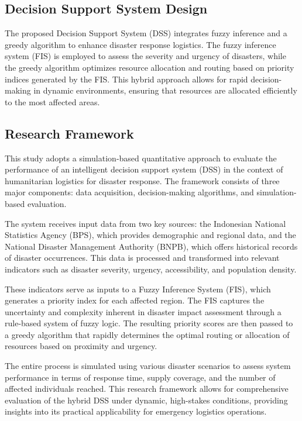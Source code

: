 \documentclass[journal,final,a4paper,twoside,11pt]{IEEEtran}
\begin{document}
\subsection{Decision Support System Design}
The proposed Decision Support System (DSS) integrates fuzzy inference and a greedy algorithm to enhance disaster response logistics. The fuzzy inference system (FIS) is employed to assess the severity and urgency of disasters, while the greedy algorithm optimizes resource allocation and routing based on priority indices generated by the FIS. This hybrid approach allows for rapid decision-making in dynamic environments, ensuring that resources are allocated efficiently to the most affected areas.


\subsection{Research Framework}

This study adopts a simulation-based quantitative approach to evaluate the performance of an intelligent decision support system (DSS) in the context of humanitarian logistics for disaster response. The framework consists of three major components: data acquisition, decision-making algorithms, and simulation-based evaluation.

The system receives input data from two key sources: the Indonesian National Statistics Agency (BPS), which provides demographic and regional data, and the National Disaster Management Authority (BNPB), which offers historical records of disaster occurrences. This data is processed and transformed into relevant indicators such as disaster severity, urgency, accessibility, and population density.

These indicators serve as inputs to a Fuzzy Inference System (FIS), which generates a priority index for each affected region. The FIS captures the uncertainty and complexity inherent in disaster impact assessment through a rule-based system of fuzzy logic. The resulting priority scores are then passed to a greedy algorithm that rapidly determines the optimal routing or allocation of resources based on proximity and urgency.

The entire process is simulated using various disaster scenarios to assess system performance in terms of response time, supply coverage, and the number of affected individuals reached. This research framework allows for comprehensive evaluation of the hybrid DSS under dynamic, high-stakes conditions, providing insights into its practical applicability for emergency logistics operations.
\end{document}
